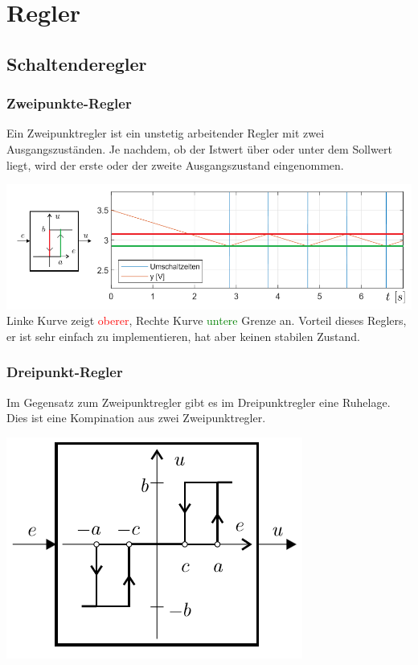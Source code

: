 \section{Regler}
\subsection{Schaltenderegler}
\subsubsection{Zweipunkte-Regler}
Ein Zweipunktregler ist ein unstetig arbeitender Regler mit zwei Ausgangszuständen. Je nachdem,
ob der Istwert über oder unter dem Sollwert liegt, wird der erste oder der zweite Ausgangszustand
eingenommen.

\includegraphics[width=\columnwidth,keepaspectratio=true]{Images/zweipunkte-regler}\\
Linke Kurve zeigt \textcolor{red}{oberer}, Rechte Kurve \textcolor{green}{untere} Grenze an. Vorteil dieses Reglers, er ist sehr einfach zu implementieren, hat aber keinen stabilen Zustand.

\subsubsection{Dreipunkt-Regler}
Im Gegensatz zum Zweipunktregler gibt es im Dreipunktregler eine Ruhelage. Dies ist eine Kompination aus zwei Zweipunktregler.\\
\begin{center}
	\includegraphics[width=0.3\columnwidth]{Images/dreipunktregler}
\end{center}


